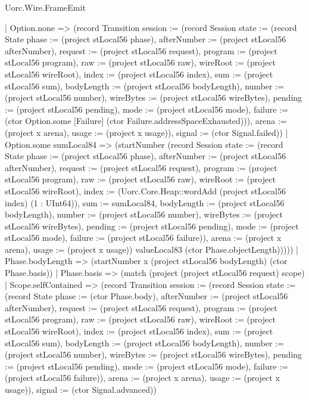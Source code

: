 \begin{lexlean}{Uorc.Wire.FrameEmit}
\begin{semanticmodule}
{            | Option.none => (record Transition {session := (record Session {state := (record State {phase := (project stLocal56 phase), afterNumber := (project stLocal56 afterNumber), request := (project stLocal56 request), program := (project stLocal56 program), raw := (project stLocal56 raw), wireRoot := (project stLocal56 wireRoot), index := (project stLocal56 index), sum := (project stLocal56 sum), bodyLength := (project stLocal56 bodyLength), number := (project stLocal56 number), wireBytes := (project stLocal56 wireBytes), pending := (project stLocal56 pending), mode := (project stLocal56 mode), failure := (ctor Option.some [Failure] (ctor Failure.addressSpaceExhausted))}), arena := (project x arena), usage := (project x usage)}), signal := (ctor Signal.failed)})
            | Option.some sumLocal84 => (startNumber (record Session {state := (record State {phase := (project stLocal56 phase), afterNumber := (project stLocal56 afterNumber), request := (project stLocal56 request), program := (project stLocal56 program), raw := (project stLocal56 raw), wireRoot := (project stLocal56 wireRoot), index := (Uorc.Core.Heap::wordAdd (project stLocal56 index) (1 : UInt64)), sum := sumLocal84, bodyLength := (project stLocal56 bodyLength), number := (project stLocal56 number), wireBytes := (project stLocal56 wireBytes), pending := (project stLocal56 pending), mode := (project stLocal56 mode), failure := (project stLocal56 failure)}), arena := (project x arena), usage := (project x usage)}) valueLocal83 (ctor Phase.objectLength)))))
        | Phase.bodyLength => (startNumber x (project stLocal56 bodyLength) (ctor Phase.basis))
        | Phase.basis => (match (project (project stLocal56 request) scope)
          | Scope.selfContained => (record Transition {session := (record Session {state := (record State {phase := (ctor Phase.body), afterNumber := (project stLocal56 afterNumber), request := (project stLocal56 request), program := (project stLocal56 program), raw := (project stLocal56 raw), wireRoot := (project stLocal56 wireRoot), index := (project stLocal56 index), sum := (project stLocal56 sum), bodyLength := (project stLocal56 bodyLength), number := (project stLocal56 number), wireBytes := (project stLocal56 wireBytes), pending := (project stLocal56 pending), mode := (project stLocal56 mode), failure := (project stLocal56 failure)}), arena := (project x arena), usage := (project x usage)}), signal := (ctor Signal.advanced)})
}
\end{semanticmodule}
\end{lexlean}
